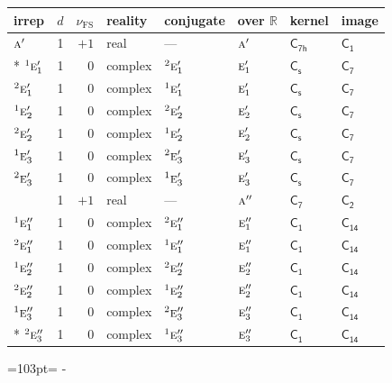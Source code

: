\documentclass[10pt,a4paper]{article}
\newcommand{\needspace}[1]{\par\penalty-100\begingroup\dimen0=#1\relax\dimen2=\pagegoal
  \advance\dimen2-\pagetotal\ifdim\dimen0>\dimen2\relax\ifdim\dimen2>0pt\vfil\break\fi\fi
  \endgroup}
\numberwithin{equation}{section}
\newcommand{\grp}[1]{\mathsf{#1}}
\newcommand{\irr}[1]{\text{\normalfont\scshape #1}}
\newcommand{\conjpair}[1]{{}^{#1}}
\newcommand{\detbox}[1]{{\setlength{\fboxsep}{1pt}\fbox{#1}}}
\newcommand{\fsind}{\nu_{\mathrm{FS}}}
\begin{document}
{\small\renewcommand{\arraystretch}{1.25}\setlength{\tabcolsep}{4pt}\begin{longtable}{@{}lrrlllll@{}}\toprule
irrep & $d$ & $\fsind$ & reality & conjugate & over $\mathbb{R}$ & kernel & image\\\midrule\endhead
\bottomrule\endfoot\endlastfoot
$\irr{a}'$ & 1 & $+1$ & real & --- & $\irr{a}'$ & \href{C7h.pdf}{$\grp{C_{7h}}$} & \href{C1.pdf}{$\grp{C_{1}}$}\\*
$\conjpair{1}\irr{e}_{1}'$ & 1 & $0$ & complex & $\conjpair{2}\irr{e}_{1}'$ & $\irr{e}_{1}'$ & \href{C1v.pdf}{$\grp{C_{s}}$} & \href{C7.pdf}{$\grp{C_{7}}$}\\
$\conjpair{2}\irr{e}_{1}'$ & 1 & $0$ & complex & $\conjpair{1}\irr{e}_{1}'$ & $\irr{e}_{1}'$ & \href{C1v.pdf}{$\grp{C_{s}}$} & \href{C7.pdf}{$\grp{C_{7}}$}\\
$\conjpair{1}\irr{e}_{2}'$ & 1 & $0$ & complex & $\conjpair{2}\irr{e}_{2}'$ & $\irr{e}_{2}'$ & \href{C1v.pdf}{$\grp{C_{s}}$} & \href{C7.pdf}{$\grp{C_{7}}$}\\
$\conjpair{2}\irr{e}_{2}'$ & 1 & $0$ & complex & $\conjpair{1}\irr{e}_{2}'$ & $\irr{e}_{2}'$ & \href{C1v.pdf}{$\grp{C_{s}}$} & \href{C7.pdf}{$\grp{C_{7}}$}\\
$\conjpair{1}\irr{e}_{3}'$ & 1 & $0$ & complex & $\conjpair{2}\irr{e}_{3}'$ & $\irr{e}_{3}'$ & \href{C1v.pdf}{$\grp{C_{s}}$} & \href{C7.pdf}{$\grp{C_{7}}$}\\
$\conjpair{2}\irr{e}_{3}'$ & 1 & $0$ & complex & $\conjpair{1}\irr{e}_{3}'$ & $\irr{e}_{3}'$ & \href{C1v.pdf}{$\grp{C_{s}}$} & \href{C7.pdf}{$\grp{C_{7}}$}\\
\detbox{$\irr{a}''$} & 1 & $+1$ & real & --- & $\irr{a}''$ & \href{C7.pdf}{$\grp{C_{7}}$} & \href{C2.pdf}{$\grp{C_{2}}$}\\
$\conjpair{1}\irr{e}_{1}''$ & 1 & $0$ & complex & $\conjpair{2}\irr{e}_{1}''$ & $\irr{e}_{1}''$ & \href{C1.pdf}{$\grp{C_{1}}$} & $\grp{C_{14}}$\\
$\conjpair{2}\irr{e}_{1}''$ & 1 & $0$ & complex & $\conjpair{1}\irr{e}_{1}''$ & $\irr{e}_{1}''$ & \href{C1.pdf}{$\grp{C_{1}}$} & $\grp{C_{14}}$\\
$\conjpair{1}\irr{e}_{2}''$ & 1 & $0$ & complex & $\conjpair{2}\irr{e}_{2}''$ & $\irr{e}_{2}''$ & \href{C1.pdf}{$\grp{C_{1}}$} & $\grp{C_{14}}$\\
$\conjpair{2}\irr{e}_{2}''$ & 1 & $0$ & complex & $\conjpair{1}\irr{e}_{2}''$ & $\irr{e}_{2}''$ & \href{C1.pdf}{$\grp{C_{1}}$} & $\grp{C_{14}}$\\
$\conjpair{1}\irr{e}_{3}''$ & 1 & $0$ & complex & $\conjpair{2}\irr{e}_{3}''$ & $\irr{e}_{3}''$ & \href{C1.pdf}{$\grp{C_{1}}$} & $\grp{C_{14}}$\\*
$\conjpair{2}\irr{e}_{3}''$ & 1 & $0$ & complex & $\conjpair{1}\irr{e}_{3}''$ & $\irr{e}_{3}''$ & \href{C1.pdf}{$\grp{C_{1}}$} & $\grp{C_{14}}$\\
\bottomrule\end{longtable}}
\needspace{103pt}
\end{document}
